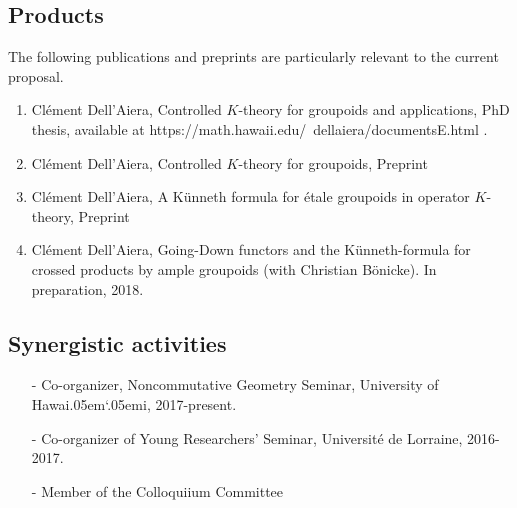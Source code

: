 \documentclass[11pt]{article}
\newcommand{\Hawaii}{Hawai\kern.05em`\kern.05em\relax i}
\begin{document}
\vspace{.5cm} 

\subsection*{Products}

The following publications and preprints are particularly relevant to the current proposal.

\begin{enumerate}
\item Cl\'ement Dell'Aiera, Controlled $K$-theory for groupoids and applications, PhD thesis, available at https://math.hawaii.edu/~dellaiera/documentsE.html .
\item Cl\'ement Dell'Aiera, Controlled $K$-theory for groupoids, Preprint
\item Cl\'ement Dell'Aiera, A K\"{u}nneth formula for \'etale groupoids in operator $K$-theory, Preprint 
\item Cl\'ement Dell'Aiera, Going-Down functors and the Künneth-formula for crossed products by ample groupoids (with Christian Bönicke). In preparation, 2018. 
\end{enumerate}

\vspace{.5cm}

\subsection*{Synergistic activities}

\begin{itemize}
\item[-] Co-organizer, Noncommutative Geometry Seminar, University of \Hawaii, 2017-present.
\item[-] Co-organizer of Young Researchers' Seminar, Universit\'e de Lorraine, 2016-2017.
\item[-] Member of the Colloquiium Committee
\end{itemize}

\vspace{.2cm}

\end{document}
